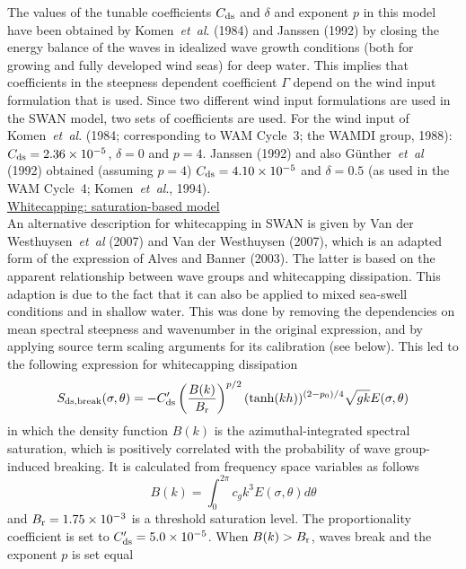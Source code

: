 \documentclass[12pt]{book}
\begin{document}
The values of the tunable coefficients $C_{\rm ds}$ and $\delta$ and exponent $p$ in this model have been obtained by
Komen~{\it et~al}. (1984) and Janssen (1992) by closing the energy balance of the waves in idealized wave growth conditions
(both for growing and fully developed wind seas) for deep water. This implies that coefficients in the steepness dependent
coefficient $\Gamma$ depend on the wind input formulation that is used. Since two different wind input formulations are
used in the SWAN model, two sets of coefficients are used. For the wind input of Komen~{\it et~al}. (1984; corresponding to WAM
Cycle~3; the WAMDI group, 1988): $C_{\rm ds} = 2.36 \times 10^{-5}$, $\delta=0$ and $p=4$. Janssen (1992) and also
G\"{u}nther~{\it et~al} (1992) obtained (assuming $p=4$) $C_{\rm ds} = 4.10 \times 10^{-5}$ and $\delta=0.5$ (as used in the WAM
Cycle~4; Komen~{\it et~al}., 1994).
\\[2ex]
\noindent
\underline{Whitecapping: saturation-based model}\\[2ex]
An alternative description for whitecapping in SWAN is given by Van der Westhuysen~{\it et~al} (2007) and
Van der Westhuysen (2007), which is an adapted form of the expression of Alves and Banner (2003). The latter is based
on the apparent relationship between wave groups and whitecapping dissipation. This adaption is due to the fact that it
can also be applied to mixed sea-swell conditions and in shallow water. This was done by removing the dependencies on mean
spectral steepness and wavenumber in the original expression, and by applying source term scaling arguments for its
calibration (see below). This led to the following expression for whitecapping dissipation
\begin{equation}
  S_{\rm ds,break} (\sigma,\theta) = -C'_{\rm ds} \left( \frac{B(k)}{B_{\rm r}} \right)^{p/2} (\tanh(kh))^{(2-p_0)/4}
                                  \sqrt{gk} E(\sigma,\theta)
  \label{eq:satu}
\end{equation}
in which the density function $B(k)$ is the azimuthal-integrated spectral saturation, which is positively correlated with
the probability of wave group-induced breaking. It is calculated from frequency space variables as follows
\begin{equation}
  B(k) = \int_{0}^{2\pi} c_g k^3 E(\sigma,\theta) d\theta
\end{equation}
and $B_{\rm r} = 1.75 \times 10^{-3}$ is a threshold saturation level. The proportionality coefficient is set to
$C'_{\rm ds} = 5.0 \times 10^{-5}$. When $B(k) > B_{\rm r}$, waves break and the exponent $p$ is set equal
\end{document}
